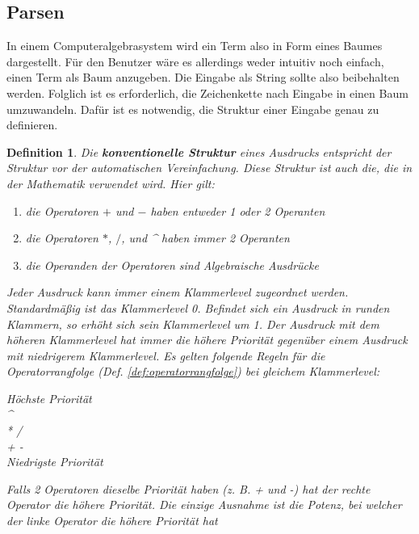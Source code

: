 \documentclass[11pt]{article}
\newtheorem{defin}{Definition}
\newcommand{\lab}[1]{(Def. \ref{#1})}
\begin{document}
\subsection{Parsen}
In einem Computeralgebrasystem wird ein Term also in Form eines Baumes dargestellt. 
Für den Benutzer wäre es allerdings weder intuitiv noch einfach, einen Term als Baum anzugeben. 
Die Eingabe als String sollte also beibehalten werden. 
Folglich ist es erforderlich, die Zeichenkette nach Eingabe in einen Baum umzuwandeln.
Dafür ist es notwendig, die Struktur einer Eingabe genau zu definieren.

\begin{defin}
  \label{def:konventionelle_struktur}
  Die \textbf{konventionelle Struktur} eines Ausdrucks entspricht der Struktur vor der automatischen Vereinfachung. 
  Diese Struktur ist auch die, die in der Mathematik verwendet wird. Hier gilt:

  \begin{enumerate}
    \item die Operatoren $+$ und $-$ haben entweder 1 oder 2 Operanten
    \item die Operatoren $*$, $/$, und \textrm{\textasciicircum} haben immer 2 Operanten
    \item die Operanden der Operatoren  sind Algebraische Ausdrücke
  \end{enumerate}

  Jeder Ausdruck kann immer einem Klammerlevel zugeordnet werden. 
  Standardmäßig ist das Klammerlevel 0. Befindet sich ein Ausdruck in runden Klammern, 
  so erhöht sich sein Klammerlevel um 1. Der Ausdruck mit dem höheren Klammerlevel hat immer die höhere Priorität 
  gegenüber einem Ausdruck mit niedrigerem Klammerlevel.
  Es gelten folgende Regeln für die Operatorrangfolge \lab{def:operatorrangfolge} bei gleichem Klammerlevel:

  \begin{center}
    Höchste Priorität \\
    \textrm{\textasciicircum} \\
    \textrm{* /} \\
    \textrm{+ -} \\
    Niedrigste Priorität
  \end{center}

  Falls 2 Operatoren dieselbe Priorität haben (z. B. + und -) hat 
  der rechte Operator die höhere Priorität.
  Die einzige Ausnahme ist die Potenz, bei welcher der linke Operator
  die höhere Priorität hat

\end{defin}
\end{document}
